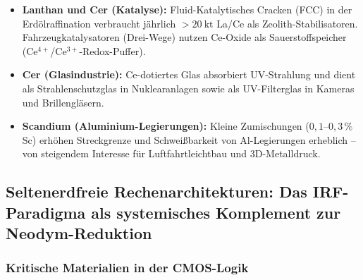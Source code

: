 ﻿\documentclass[12pt, a4paper]{report}
\theoremstyle{definition}
\theoremstyle{remark}
\begin{document}
\begin{itemize}
  \item \textbf{Lanthan und Cer (Katalyse):} Fluid-Katalytisches Cracken (FCC)
        in der Erdölraffination verbraucht jährlich $>\SI{20}{\kilo\tonne}$ La/Ce
        als Zeolith-Stabilisatoren. Fahrzeugkatalysatoren (Drei-Wege) nutzen
        Ce-Oxide als Sauerstoffspeicher (Ce$^{4+}$/Ce$^{3+}$-Redox-Puffer).
  \item \textbf{Cer (Glasindustrie):} Ce-dotiertes Glas absorbiert UV-Strahlung
        und dient als Strahlenschutzglas in Nuklearanlagen sowie als
        UV-Filterglas in Kameras und Brillengläsern.
  \item \textbf{Scandium (Aluminium-Legierungen):} Kleine Zumischungen
        ($0{,}1$--$0{,}3\,\%$ Sc) erhöhen Streckgrenze und Schweißbarkeit
        von Al-Legierungen erheblich -- von steigendem Interesse für
        Luft\-fahrt\-leichtbau und 3D-Metalldruck.
\end{itemize}

\subsection{Seltenerdfreie Rechenarchitekturen: Das IRF-Paradigma als
            systemisches Komplement zur Neodym-Reduktion}
\label{ssec:irf_selteneerden}

\subsubsection{Kritische Materialien in der CMOS-Logik}
\end{document}
